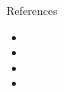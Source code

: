 \documentclass[final,t]{beamer}
\begin{document}
\begin{frame}{}
\begin{columns}[t]
\begin{column}{.30\linewidth}
\begin{block}{References}
{\small
  \begin{itemize} 
\item {}
\item {}
\item {}
\item {}
  \end{itemize}
}
% 
\end{block}
\end{column}

\end{columns}

\end{frame}
\end{document}
